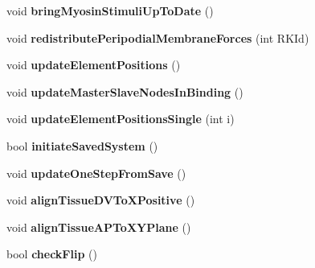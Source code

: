 \begin{DoxyCompactItemize}
\item 
\hypertarget{classSimulation_a85e729bc4b2fcf4a1a44f66552554208}{}void {\bfseries bring\+Myosin\+Stimuli\+Up\+To\+Date} ()\label{classSimulation_a85e729bc4b2fcf4a1a44f66552554208}

\item 
\hypertarget{classSimulation_a0f2aafedd2ceaab7ef60b9493aa98b21}{}void {\bfseries redistribute\+Peripodial\+Membrane\+Forces} (int R\+K\+Id)\label{classSimulation_a0f2aafedd2ceaab7ef60b9493aa98b21}

\item 
\hypertarget{classSimulation_aa92f90b98dc049a3206b4906ebf52585}{}void {\bfseries update\+Element\+Positions} ()\label{classSimulation_aa92f90b98dc049a3206b4906ebf52585}

\item 
\hypertarget{classSimulation_a59684286f79843524da38d1bb30718a6}{}void {\bfseries update\+Master\+Slave\+Nodes\+In\+Binding} ()\label{classSimulation_a59684286f79843524da38d1bb30718a6}

\item 
\hypertarget{classSimulation_ab9fc29a2decb03a07e31e3ebb8801aec}{}void {\bfseries update\+Element\+Positions\+Single} (int i)\label{classSimulation_ab9fc29a2decb03a07e31e3ebb8801aec}

\item 
\hypertarget{classSimulation_a6ef90fd76ed4f6bb9d063e7e72e9a983}{}bool {\bfseries initiate\+Saved\+System} ()\label{classSimulation_a6ef90fd76ed4f6bb9d063e7e72e9a983}

\item 
\hypertarget{classSimulation_a1f5dbbde572af555225089e247296e2e}{}void {\bfseries update\+One\+Step\+From\+Save} ()\label{classSimulation_a1f5dbbde572af555225089e247296e2e}

\item 
\hypertarget{classSimulation_a91a12f6ac1b230cecbe004221326a7ca}{}void {\bfseries align\+Tissue\+D\+V\+To\+X\+Positive} ()\label{classSimulation_a91a12f6ac1b230cecbe004221326a7ca}

\item 
\hypertarget{classSimulation_a4d865136f9cb930b986af8bc86b6bd10}{}void {\bfseries align\+Tissue\+A\+P\+To\+X\+Y\+Plane} ()\label{classSimulation_a4d865136f9cb930b986af8bc86b6bd10}

\item 
\hypertarget{classSimulation_a7aa2db4c2819e37c0ded181d47467233}{}bool {\bfseries check\+Flip} ()\label{classSimulation_a7aa2db4c2819e37c0ded181d47467233}


\end{DoxyCompactItemize}
